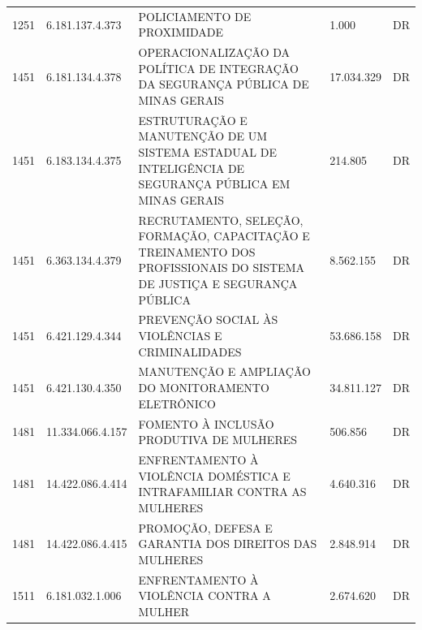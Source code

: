 \documentclass{article}
\begin{document}
\begin{longtable}[c]{m{1cm}|m{2cm}|m{10cm}|m{2cm}|m{1cm}}
\multicolumn{1}{C{1cm}|}{1251} & \multicolumn{1}{C{2cm}|}{6.181.137.4.373} & \multicolumn{1}{L{10cm}|}{POLICIAMENTO DE PROXIMIDADE} & \multicolumn{1}{R{2cm}|}{1.000} & \multicolumn{1}{C{1cm}}{DR} \\
\multicolumn{1}{C{1cm}|}{1451} & \multicolumn{1}{C{2cm}|}{6.181.134.4.378} & \multicolumn{1}{L{10cm}|}{OPERACIONALIZAÇÃO DA POLÍTICA DE INTEGRAÇÃO DA SEGURANÇA PÚBLICA DE MINAS GERAIS} & \multicolumn{1}{R{2cm}|}{17.034.329} & \multicolumn{1}{C{1cm}}{DR} \\
\multicolumn{1}{C{1cm}|}{1451} & \multicolumn{1}{C{2cm}|}{6.183.134.4.375} & \multicolumn{1}{L{10cm}|}{ESTRUTURAÇÃO E MANUTENÇÃO DE UM SISTEMA ESTADUAL DE INTELIGÊNCIA DE SEGURANÇA PÚBLICA EM MINAS GERAIS} & \multicolumn{1}{R{2cm}|}{214.805} & \multicolumn{1}{C{1cm}}{DR} \\
\multicolumn{1}{C{1cm}|}{1451} & \multicolumn{1}{C{2cm}|}{6.363.134.4.379} & \multicolumn{1}{L{10cm}|}{RECRUTAMENTO, SELEÇÃO, FORMAÇÃO, CAPACITAÇÃO E TREINAMENTO DOS PROFISSIONAIS DO SISTEMA DE JUSTIÇA E SEGURANÇA PÚBLICA} & \multicolumn{1}{R{2cm}|}{8.562.155} & \multicolumn{1}{C{1cm}}{DR} \\
\multicolumn{1}{C{1cm}|}{1451} & \multicolumn{1}{C{2cm}|}{6.421.129.4.344} & \multicolumn{1}{L{10cm}|}{PREVENÇÃO SOCIAL ÀS VIOLÊNCIAS E CRIMINALIDADES} & \multicolumn{1}{R{2cm}|}{53.686.158} & \multicolumn{1}{C{1cm}}{DR} \\
\multicolumn{1}{C{1cm}|}{1451} & \multicolumn{1}{C{2cm}|}{6.421.130.4.350} & \multicolumn{1}{L{10cm}|}{MANUTENÇÃO E AMPLIAÇÃO DO MONITORAMENTO ELETRÔNICO} & \multicolumn{1}{R{2cm}|}{34.811.127} & \multicolumn{1}{C{1cm}}{DR} \\
\multicolumn{1}{C{1cm}|}{1481} & \multicolumn{1}{C{2cm}|}{11.334.066.4.157} & \multicolumn{1}{L{10cm}|}{FOMENTO À INCLUSÃO PRODUTIVA DE MULHERES} & \multicolumn{1}{R{2cm}|}{506.856} & \multicolumn{1}{C{1cm}}{DR} \\
\multicolumn{1}{C{1cm}|}{1481} & \multicolumn{1}{C{2cm}|}{14.422.086.4.414} & \multicolumn{1}{L{10cm}|}{ENFRENTAMENTO À VIOLÊNCIA DOMÉSTICA E INTRAFAMILIAR CONTRA AS MULHERES} & \multicolumn{1}{R{2cm}|}{4.640.316} & \multicolumn{1}{C{1cm}}{DR} \\
\multicolumn{1}{C{1cm}|}{1481} & \multicolumn{1}{C{2cm}|}{14.422.086.4.415} & \multicolumn{1}{L{10cm}|}{PROMOÇÃO, DEFESA E GARANTIA DOS DIREITOS DAS MULHERES} & \multicolumn{1}{R{2cm}|}{2.848.914} & \multicolumn{1}{C{1cm}}{DR} \\
\multicolumn{1}{C{1cm}|}{1511} & \multicolumn{1}{C{2cm}|}{6.181.032.1.006} & \multicolumn{1}{L{10cm}|}{ENFRENTAMENTO À VIOLÊNCIA CONTRA A MULHER} & \multicolumn{1}{R{2cm}|}{2.674.620} & \multicolumn{1}{C{1cm}}{DR} \\

\end{longtable}
\end{document}
